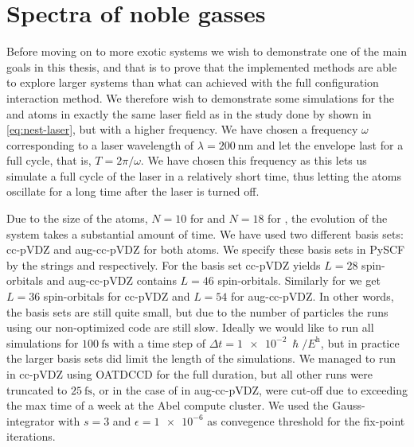     \section{Spectra of noble gasses}
        \label{sec:noble-gasses}
        Before moving on to more exotic systems we wish to demonstrate one of
        the main goals in this thesis, and that is to prove that the implemented
        methods are able to explore larger systems than what can achieved with
        the full configuration interaction method.
        We therefore wish to demonstrate some simulations for the  and
         atoms in exactly the same laser field as in the study done by
        \citeauthor{nest} \cite{nest} shown in \autoref{eq:nest-laser}, but with
        a higher frequency.
        We have chosen a frequency $\omega$ corresponding to a laser wavelength
        of $\lambda = \SI{200}{\nm}$ and let the envelope last for a full cycle,
        that is, $T = 2\pi / \omega$.
        We have chosen this frequency as this lets us simulate a full cycle of the
        laser in a relatively short time, thus letting the atoms oscillate for a
        long time after the laser is turned off.

        Due to the size of the atoms, $N = 10$ for  and $N = 18$ for
        , the evolution of the system takes a substantial amount of time.
        We have used two different basis sets: cc-pVDZ and aug-cc-pVDZ for both
        atoms.
        We specify these basis sets in PySCF \cite{pyscf} by the strings
         and  respectively.
        For  the basis set cc-pVDZ yields $L = 28$ spin-orbitals and
        aug-cc-pVDZ contains $L = 46$ spin-orbitals.
        Similarly for  we get $L = 36$ spin-orbitals for cc-pVDZ and $L =
        54$ for aug-cc-pVDZ.
        In other words, the basis sets are still quite small, but due to the
        number of particles the runs using our non-optimized code are still
        slow.
        Ideally we would like to run all simulations for $\SI{100}{\fs}$ with a
        time step of $\Delta t = \SI{1e-2}{\hslash/\hartree}$, but in
        practice the larger basis sets did limit the length of the simulations.
        We managed to run  in cc-pVDZ using OATDCCD for the full
        duration, but all other runs were truncated to $\SI{25}{\fs}$, or in the
        case of  in aug-cc-pVDZ, were cut-off due to exceeding the max
        time of a week at the Abel compute cluster.
        We used the Gauss-integrator with $s = 3$ and $\epsilon = \num{1e-6}$ as
        convegence threshold for the fix-point iterations.

